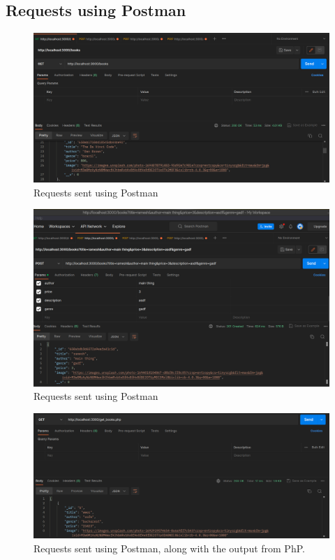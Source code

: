 \documentclass[11pt]{article}
\begin{document}
\subsection{Requests using Postman}

\begin{figure}[H]
    \centering
    \includegraphics[width=.95\textwidth]{screenshots/postman 1.png}
    \caption{Requests sent using Postman}
\end{figure}

\begin{figure}[H]
    \centering
    \includegraphics[width=.95\textwidth]{screenshots/postman 2.png}
    \caption{Requests sent using Postman}
\end{figure}

\begin{figure}[H]
    \centering
    \includegraphics[width=.95\textwidth]{screenshots/postman 3.png}
    \caption{Requests sent using Postman, along with the output from PhP. }
\end{figure}
\end{document}
